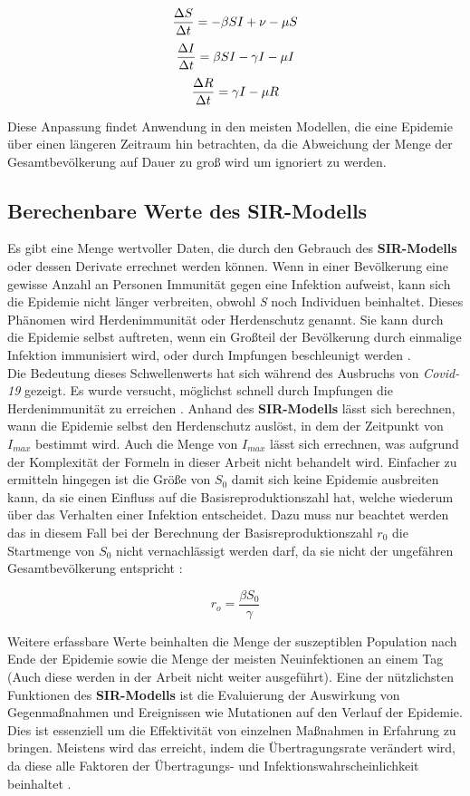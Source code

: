 \documentclass[12pt]{scrartcl} %
\begin{document}
$$ \frac{\Delta S}{\Delta t} = -\beta\space S I + \nu - \mu S $$
$$ \frac{\Delta I}{\Delta t} = \beta\space S I -\gamma\space I - \mu I $$
$$ \frac{\Delta R}{\Delta t} = \gamma\space I - \mu R $$

Diese Anpassung findet Anwendung in den meisten Modellen, die eine Epidemie über einen längeren Zeitraum hin betrachten, da die Abweichung der Menge der Gesamtbevölkerung auf Dauer zu groß wird um ignoriert zu werden.


\subsection{Berechenbare Werte des SIR-Modells}

Es gibt eine Menge wertvoller Daten, die durch den Gebrauch des \textbf{SIR-Modells} oder dessen Derivate errechnet werden können.
Wenn in einer Bevölkerung eine gewisse Anzahl an Personen Immunität gegen eine Infektion aufweist, kann sich die Epidemie nicht länger verbreiten, obwohl \textsl{S} noch Individuen beinhaltet. Dieses Phänomen wird Herdenimmunität oder Herdenschutz genannt. Sie kann durch die Epidemie selbst auftreten, wenn ein Großteil der Bevölkerung durch einmalige Infektion immunisiert wird, oder durch Impfungen beschleunigt werden \cite{3}.\\
Die Bedeutung dieses Schwellenwerts hat sich während des Ausbruchs von \textsl{Covid-19} gezeigt. Es wurde versucht, möglichst schnell durch Impfungen die Herdenimmunität zu erreichen \cite{10}. Anhand des \textbf{SIR-Modells} lässt sich berechnen, wann die Epidemie selbst den Herdenschutz auslöst, in dem der Zeitpunkt von $ \textit{I}_{max} $ bestimmt wird. Auch die Menge von $ \textit{I}_{max} $ lässt sich errechnen, was aufgrund der Komplexität der Formeln in dieser Arbeit nicht behandelt wird. Einfacher zu ermitteln hingegen ist die Größe von $ \textit{S}_{0} $ damit sich keine Epidemie ausbreiten kann, da sie einen Einfluss auf die Basisreproduktionszahl hat, welche wiederum über das Verhalten einer Infektion entscheidet. 
Dazu muss nur beachtet werden das in diesem Fall bei der Berechnung der Basisreproduktionszahl $\textit{r}_{0} $ die Startmenge von $ \textit{S}_{0}$ nicht vernachlässigt werden darf, da sie nicht der ungefähren Gesamtbevölkerung entspricht \cite{7, 10}:

$$ r_{o} = \frac{\beta S_{0}}{\gamma} $$

Weitere erfassbare Werte beinhalten die Menge der suszeptiblen Population nach Ende der Epidemie sowie die Menge der meisten Neuinfektionen an einem Tag (Auch diese werden in der Arbeit nicht weiter ausgeführt). Eine der nützlichsten Funktionen des \textbf{SIR-Modells} ist die Evaluierung der Auswirkung von Gegenmaßnahmen und Ereignissen wie Mutationen auf den Verlauf der Epidemie. Dies ist essenziell um die Effektivität von einzelnen Maßnahmen in Erfahrung zu bringen. Meistens wird das erreicht, indem die Übertragungsrate \textbeta\space verändert wird, da diese alle Faktoren der Übertragungs- und Infektionswahrscheinlichkeit beinhaltet \cite{8, 6, 9}.
\end{document}
